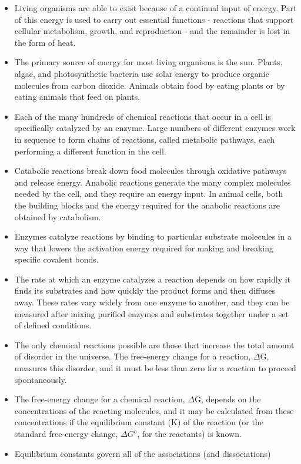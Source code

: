 \begin{itemize}
\item Living organisms are able to exist because of a continual input
of energy. Part of this energy is used to carry out essential functions
- reactions that support cellular metabolism, growth, and
reproduction - and the remainder is lost in the form of heat.
\item The primary source of energy for most living organisms is the sun.
Plants, algae, and photosynthetic bacteria use solar energy to produce
organic molecules from carbon dioxide. Animals obtain food by
eating plants or by eating animals that feed on plants.
\item Each of the many hundreds of chemical reactions that occur in a cell
is specifically catalyzed by an enzyme. Large numbers of different
enzymes work in sequence to form chains of reactions, called metabolic
pathways, each performing a different function in the cell.
\item Catabolic reactions break down food molecules through oxidative
pathways and release energy. Anabolic reactions generate the
many complex molecules needed by the cell, and they require an
energy input. In animal cells, both the building blocks and the energy
required for the anabolic reactions are obtained by catabolism.
\item Enzymes catalyze reactions by binding to particular substrate molecules
in a way that lowers the activation energy required for making
and breaking specific covalent bonds.
\item The rate at which an enzyme catalyzes a reaction depends on how
rapidly it finds its substrates and how quickly the product forms and
then diffuses away. These rates vary widely from one enzyme to
another, and they can be measured after mixing purified enzymes
and substrates together under a set of defined conditions.
\item The only chemical reactions possible are those that increase the
total amount of disorder in the universe. The free-energy change for
a reaction, $\Delta$G, measures this disorder, and it must be less than zero
for a reaction to proceed spontaneously.
\item The free-energy change for a chemical reaction, $\Delta$G, depends on the
concentrations of the reacting molecules, and it may be calculated
from these concentrations if the equilibrium constant (K) of the reaction
(or the standard free-energy change, $\Delta G^{o}$, for the reactants) is
known.
\item Equilibrium constants govern all of the associations (and dissociations)

\end{itemize}
